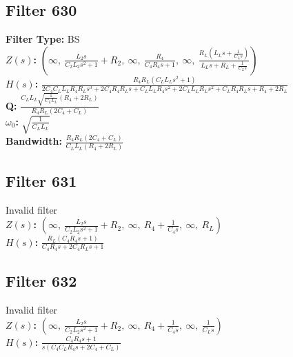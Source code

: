\documentclass{article}
\begin{document}
\subsection*{Filter 630}
\textbf{Filter Type:} BS \\ 
\textbf{$Z(s)$:} $\left( \infty, \  \frac{L_{2} s}{C_{2} L_{2} s^{2} + 1} + R_{2}, \  \infty, \  \frac{R_{4}}{C_{4} R_{4} s + 1}, \  \infty, \  \frac{R_{L} \left(L_{L} s + \frac{1}{C_{L} s}\right)}{L_{L} s + R_{L} + \frac{1}{C_{L} s}}\right)$ \\ 
\textbf{$H(s)$:} $\frac{R_{4} R_{L} \left(C_{L} L_{L} s^{2} + 1\right)}{2 C_{4} C_{L} L_{L} R_{4} R_{L} s^{3} + 2 C_{4} R_{4} R_{L} s + C_{L} L_{L} R_{4} s^{2} + 2 C_{L} L_{L} R_{L} s^{2} + C_{L} R_{4} R_{L} s + R_{4} + 2 R_{L}}$ \\ 
\textbf{Q:} $\frac{C_{L} L_{L} \sqrt{\frac{1}{C_{L} L_{L}}} \left(R_{4} + 2 R_{L}\right)}{R_{4} R_{L} \left(2 C_{4} + C_{L}\right)}$ \\ 
\textbf{$\omega_0$:} $\sqrt{\frac{1}{C_{L} L_{L}}}$ \\ 
\textbf{Bandwidth:} $\frac{R_{4} R_{L} \left(2 C_{4} + C_{L}\right)}{C_{L} L_{L} \left(R_{4} + 2 R_{L}\right)}$ \\ 
\subsection*{Filter 631}
Invalid filter \\ 
\textbf{$Z(s)$:} $\left( \infty, \  \frac{L_{2} s}{C_{2} L_{2} s^{2} + 1} + R_{2}, \  \infty, \  R_{4} + \frac{1}{C_{4} s}, \  \infty, \  R_{L}\right)$ \\ 
\textbf{$H(s)$:} $\frac{R_{L} \left(C_{4} R_{4} s + 1\right)}{C_{4} R_{4} s + 2 C_{4} R_{L} s + 1}$ \\ 
\subsection*{Filter 632}
Invalid filter \\ 
\textbf{$Z(s)$:} $\left( \infty, \  \frac{L_{2} s}{C_{2} L_{2} s^{2} + 1} + R_{2}, \  \infty, \  R_{4} + \frac{1}{C_{4} s}, \  \infty, \  \frac{1}{C_{L} s}\right)$ \\ 
\textbf{$H(s)$:} $\frac{C_{4} R_{4} s + 1}{s \left(C_{4} C_{L} R_{4} s + 2 C_{4} + C_{L}\right)}$ \\ 
\end{document}

